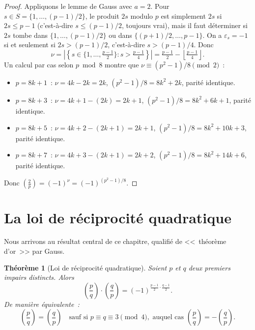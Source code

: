 \documentclass[12pt,a4paper,openany]{book}
\theoremstyle{definition}
\theoremstyle{plain}
\newtheorem{theoreme}[definition]{Théorème}
\theoremstyle{remark}
\newcommand{\abs}[1]{\left|#1\right|}
\newcommand{\floor}[1]{\left\lfloor #1 \right\rfloor}
\newcommand{\legendre}[2]{\left(\frac{#1}{#2}\right)}
\begin{document}
\begin{proof}
Appliquons le lemme de Gauss avec $a = 2$. Pour $s \in S = \{1, \ldots, (p-1)/2\}$,
le produit $2s$ modulo $p$ est simplement $2s$ si $2s \leq p-1$
(c'est-à-dire $s \leq (p-1)/2$, toujours vrai), mais il faut déterminer
si $2s$ tombe dans $\{1, \ldots, (p-1)/2\}$ ou dans $\{(p+1)/2, \ldots, p-1\}$.
On a $\varepsilon_s = -1$ si et seulement si $2s > (p-1)/2$,
c'est-à-dire $s > (p-1)/4$. Donc
\[
  \nu = \abs{\left\{ s \in \{1, \ldots, \tfrac{p-1}{2}\} : s > \tfrac{p-1}{4} \right\}}
      = \tfrac{p-1}{2} - \floor{\tfrac{p-1}{4}}.
\]
Un calcul par cas selon $p \bmod 8$ montre que $\nu \equiv (p^2 - 1)/8 \pmod{2}$~:
\begin{itemize}
  \item $p = 8k + 1$~: $\nu = 4k - 2k = 2k$, $(p^2-1)/8 = 8k^2 + 2k$, parité identique.
  \item $p = 8k + 3$~: $\nu = 4k+1 - (2k) = 2k+1$, $(p^2-1)/8 = 8k^2+6k+1$, parité identique.
  \item $p = 8k + 5$~: $\nu = 4k+2 - (2k+1) = 2k+1$, $(p^2-1)/8 = 8k^2+10k+3$, parité identique.
  \item $p = 8k + 7$~: $\nu = 4k+3 - (2k+1) = 2k+2$, $(p^2-1)/8 = 8k^2+14k+6$, parité identique.
\end{itemize}
Donc $\legendre{2}{p} = (-1)^\nu = (-1)^{(p^2-1)/8}$.
\end{proof}

\section{La loi de réciprocité quadratique}
\label{sec:qr:reciprocite}

Nous arrivons au résultat central de ce chapitre, qualifié de <<~théorème d'or~>>
par Gauss.

\begin{theoreme}[Loi de réciprocité quadratique]
\label{thm:reciprocite-quadratique}
Soient $p$ et $q$ deux premiers impairs distincts. Alors
\[
  \legendre{p}{q} \cdot \legendre{q}{p}
  = (-1)^{\frac{p-1}{2} \cdot \frac{q-1}{2}}.
\]
De manière équivalente~:
\[
  \legendre{p}{q} = \legendre{q}{p} \quad \text{sauf si } p \equiv q \equiv 3 \pmod{4},
  \text{ auquel cas } \legendre{p}{q} = -\legendre{q}{p}.
\]
\end{theoreme}
\end{document}
